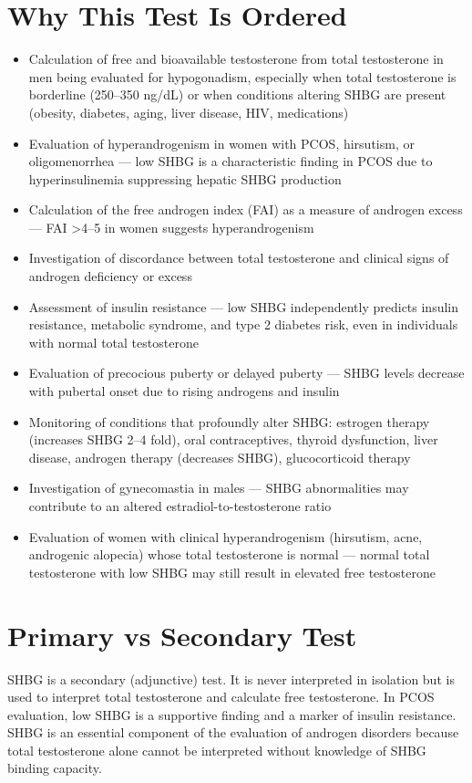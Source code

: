 \section*{Why This Test Is Ordered}
\begin{itemize}
  \item Calculation of free and bioavailable testosterone from total testosterone in men being evaluated for hypogonadism, especially when total testosterone is borderline (250--350 ng/dL) or when conditions altering SHBG are present (obesity, diabetes, aging, liver disease, HIV, medications)
  \item Evaluation of hyperandrogenism in women with PCOS, hirsutism, or oligomenorrhea --- low SHBG is a characteristic finding in PCOS due to hyperinsulinemia suppressing hepatic SHBG production
  \item Calculation of the free androgen index (FAI) as a measure of androgen excess --- FAI >4--5 in women suggests hyperandrogenism
  \item Investigation of discordance between total testosterone and clinical signs of androgen deficiency or excess
  \item Assessment of insulin resistance --- low SHBG independently predicts insulin resistance, metabolic syndrome, and type 2 diabetes risk, even in individuals with normal total testosterone
  \item Evaluation of precocious puberty or delayed puberty --- SHBG levels decrease with pubertal onset due to rising androgens and insulin
  \item Monitoring of conditions that profoundly alter SHBG: estrogen therapy (increases SHBG 2--4 fold), oral contraceptives, thyroid dysfunction, liver disease, androgen therapy (decreases SHBG), glucocorticoid therapy
  \item Investigation of gynecomastia in males --- SHBG abnormalities may contribute to an altered estradiol-to-testosterone ratio
  \item Evaluation of women with clinical hyperandrogenism (hirsutism, acne, androgenic alopecia) whose total testosterone is normal --- normal total testosterone with low SHBG may still result in elevated free testosterone
\end{itemize}

\section*{Primary vs Secondary Test}
SHBG is a secondary (adjunctive) test. It is never interpreted in isolation but is used to interpret total testosterone and calculate free testosterone. In PCOS evaluation, low SHBG is a supportive finding and a marker of insulin resistance. SHBG is an essential component of the evaluation of androgen disorders because total testosterone alone cannot be interpreted without knowledge of SHBG binding capacity.

